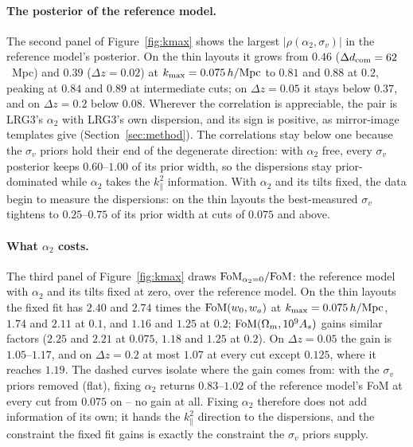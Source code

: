 \documentclass[11pt]{article}
\newcommand{\kmax}{k_{\rm max}}
\newcommand{\hMpc}{\,h/{\rm Mpc}}
\newcommand{\sv}{\sigma_v}
\newcommand{\dcom}{$\Delta d_{\rm com} = 62$~Mpc}
\begin{document}
\paragraph{The posterior of the reference model.}
The second panel of Figure~\ref{fig:kmax} shows the largest
$|\rho(\alpha_2, \sv)|$ in the reference model's posterior.  On the
thin layouts it grows from $0.46$ (\dcom{}) and $0.39$
($\Delta z = 0.02$) at $\kmax = 0.075\hMpc$ to $0.81$ and $0.88$ at
$0.2$, peaking at $0.84$ and $0.89$ at intermediate cuts; on
$\Delta z = 0.05$ it stays below $0.37$, and on $\Delta z = 0.2$
below $0.08$.  Wherever the correlation is appreciable, the pair is
LRG3's $\alpha_2$ with LRG3's own dispersion, and its sign is
positive, as mirror-image templates give (Section~\ref{sec:method}).
The correlations stay below one because the $\sv$ priors hold their
end of the degenerate direction: with $\alpha_2$ free, every $\sv$
posterior keeps $0.60$--$1.00$ of its prior width, so the dispersions
stay prior-dominated while $\alpha_2$ takes the $k_\parallel^2$
information.  With $\alpha_2$ and its tilts fixed, the data begin to
measure the dispersions: on the thin layouts the best-measured $\sv$
tightens to $0.25$--$0.75$ of its prior width at cuts of $0.075$ and
above.

\paragraph{What $\alpha_2$ costs.}
The third panel of Figure~\ref{fig:kmax} draws
${\rm FoM}_{\alpha_2 = 0}/{\rm FoM}$: the reference model with
$\alpha_2$ and its tilts fixed at zero, over the reference model.  On
the thin layouts the fixed fit has $2.40$ and $2.74$ times the
${\rm FoM}(w_0, w_a)$ at $\kmax = 0.075\hMpc$, $1.74$ and $2.11$ at
$0.1$, and $1.16$ and $1.25$ at $0.2$; ${\rm FoM}(\Omega_m, 10^9 A_s)$
gains similar factors ($2.25$ and $2.21$ at $0.075$, $1.18$ and $1.25$
at $0.2$).  On $\Delta z = 0.05$ the gain is $1.05$--$1.17$, and on
$\Delta z = 0.2$ at most $1.07$ at every cut except $0.125$, where it
reaches $1.19$.  The dashed curves isolate where the gain comes from:
with the $\sv$ priors removed (flat), fixing $\alpha_2$ returns
$0.83$--$1.02$ of the reference model's FoM at every cut from $0.075$
on -- no gain at all.  Fixing $\alpha_2$ therefore does not add
information of its own; it hands the $k_\parallel^2$ direction to the
dispersions, and the constraint the fixed fit gains is exactly the
constraint the $\sv$ priors supply.
\end{document}
